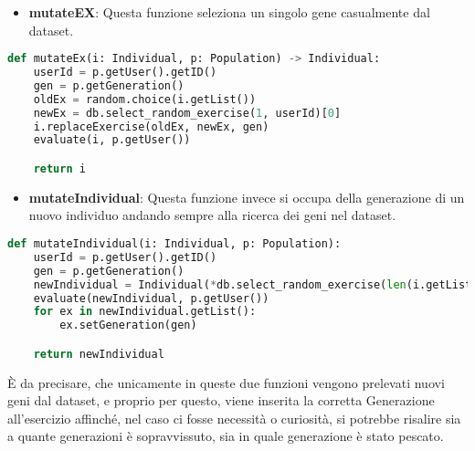 \documentclass{article}
\begin{document}
\begin{itemize}
\item\textbf{mutateEX}: Questa funzione seleziona un singolo gene casualmente dal dataset.
\end{itemize}

\begin{lstlisting}[language = Python]
def mutateEx(i: Individual, p: Population) -> Individual:
    userId = p.getUser().getID()
    gen = p.getGeneration()
    oldEx = random.choice(i.getList())
    newEx = db.select_random_exercise(1, userId)[0]
    i.replaceExercise(oldEx, newEx, gen)
    evaluate(i, p.getUser())

    return i
\end{lstlisting}

\begin{itemize}
\item\textbf{mutateIndividual}: Questa funzione invece si occupa della generazione di un nuovo individuo andando sempre alla ricerca dei geni nel dataset.
\end{itemize}

\begin{lstlisting}[language = Python]
def mutateIndividual(i: Individual, p: Population):
    userId = p.getUser().getID()
    gen = p.getGeneration()
    newIndividual = Individual(*db.select_random_exercise(len(i.getList()), userId))
    evaluate(newIndividual, p.getUser())
    for ex in newIndividual.getList():
        ex.setGeneration(gen)

    return newIndividual
\end{lstlisting}

    È da precisare, che unicamente in queste due funzioni vengono prelevati nuovi geni dal dataset, e proprio per questo, viene inserita la corretta Generazione all'esercizio affinché, nel caso ci fosse necessità o curiosità, si potrebbe risalire sia a quante generazioni è sopravvissuto, sia in quale generazione è stato pescato.

\pagebreak
\end{document}

